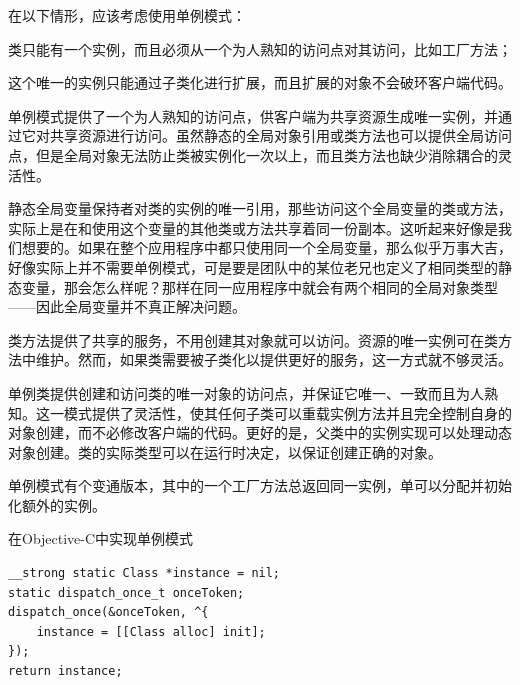 \documentclass[a4paper, 12pt]{article}
\begin{document}
在以下情形，应该考虑使用单例模式：

类只能有一个实例，而且必须从一个为人熟知的访问点对其访问，比如工厂方法；

这个唯一的实例只能通过子类化进行扩展，而且扩展的对象不会破环客户端代码。

单例模式提供了一个为人熟知的访问点，供客户端为共享资源生成唯一实例，并通过它对共享资源进行访问。虽然静态的全局对象引用或类方法也可以提供全局访问点，但是全局对象无法防止类被实例化一次以上，而且类方法也缺少消除耦合的灵活性。

静态全局变量保持者对类的实例的唯一引用，那些访问这个全局变量的类或方法，实际上是在和使用这个变量的其他类或方法共享着同一份副本。这听起来好像是我们想要的。如果在整个应用程序中都只使用同一个全局变量，那么似乎万事大吉，好像实际上并不需要单例模式，可是要是团队中的某位老兄也定义了相同类型的静态变量，那会怎么样呢？那样在同一应用程序中就会有两个相同的全局对象类型——因此全局变量并不真正解决问题。

类方法提供了共享的服务，不用创建其对象就可以访问。资源的唯一实例可在类方法中维护。然而，如果类需要被子类化以提供更好的服务，这一方式就不够灵活。

单例类提供创建和访问类的唯一对象的访问点，并保证它唯一、一致而且为人熟知。这一模式提供了灵活性，使其任何子类可以重载实例方法并且完全控制自身的对象创建，而不必修改客户端的代码。更好的是，父类中的实例实现可以处理动态对象创建。类的实际类型可以在运行时决定，以保证创建正确的对象。

单例模式有个变通版本，其中的一个工厂方法总返回同一实例，单可以分配并初始化额外的实例。

在Objective-C中实现单例模式
\begin{lstlisting}
__strong static Class *instance = nil;
static dispatch_once_t onceToken;
dispatch_once(&onceToken, ^{
	instance = [[Class alloc] init];
});
return instance;
\end{lstlisting}

\newpage
\end{document}
